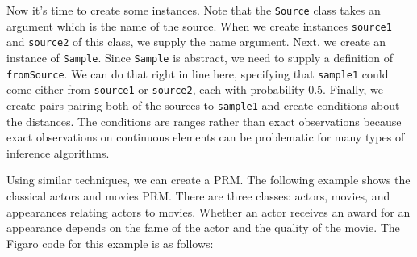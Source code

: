 Now it's time to create some instances. Note that the \texttt{Source} class takes an argument which is the name of the source. When we create instances \texttt{source1} and \texttt{source2} of this class, we supply the name argument. Next, we create an instance of \texttt{Sample}. Since \texttt{Sample} is abstract, we need to supply a definition of \texttt{fromSource}. We can do that right in line here, specifying that \texttt{sample1} could come either from \texttt{source1} or \texttt{source2}, each with probability 0.5. Finally, we create pairs pairing both of the sources to \texttt{sample1} and create conditions about the distances. The conditions are ranges rather than exact observations because exact observations on continuous elements can be problematic for many types of inference algorithms.

Using similar techniques, we can create a PRM. The following example shows the classical actors and movies PRM. There are three classes: actors, movies, and appearances relating actors to movies. Whether an actor receives an award for an appearance depends on the fame of the actor and the quality of the movie. The Figaro code for this example is as follows:

